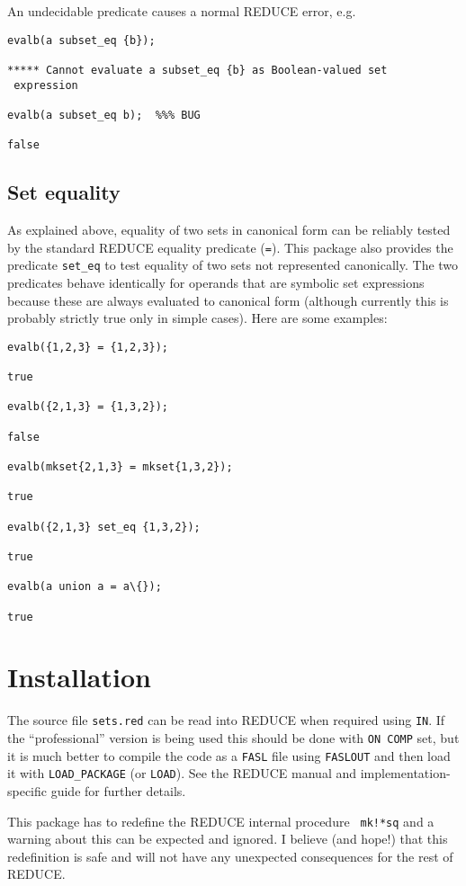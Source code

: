 An undecidable predicate causes a normal REDUCE error, e.g.
\begin{verbatim}
evalb(a subset_eq {b});

***** Cannot evaluate a subset_eq {b} as Boolean-valued set
 expression

evalb(a subset_eq b);  %%% BUG

false
\end{verbatim}


\subsection{Set equality}

As explained above, equality of two sets in canonical form can be
reliably tested by the standard REDUCE equality predicate ({\tt =}).
This package also provides the predicate {\tt set\_eq} to test
equality of two sets not represented canonically.  The two predicates
behave identically for operands that are symbolic set expressions
because these are always evaluated to canonical form (although
currently this is probably strictly true only in simple cases).  Here
are some examples:
\begin{verbatim}
evalb({1,2,3} = {1,2,3});

true

evalb({2,1,3} = {1,3,2});

false

evalb(mkset{2,1,3} = mkset{1,3,2});

true

evalb({2,1,3} set_eq {1,3,2});

true

evalb(a union a = a\{});

true
\end{verbatim}


\section{Installation}

The source file {\tt sets.red} can be read into REDUCE when required
using {\tt IN}.  If the ``professional'' version is being used this
should be done with {\tt ON COMP} set, but it is much better to
compile the code as a {\tt FASL} file using {\tt FASLOUT} and then
load it with {\tt LOAD\_PACKAGE} (or {\tt LOAD}).  See the REDUCE
manual and implementation-specific guide for further details.

This package has to redefine the REDUCE internal procedure {\tt
mk!*sq} and a warning about this can be expected and ignored.  I
believe (and hope!) that this redefinition is safe and will not have
any unexpected consequences for the rest of REDUCE.


